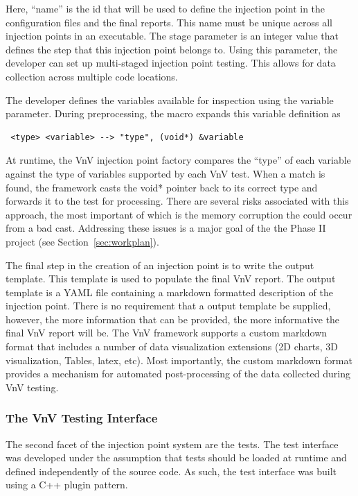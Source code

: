 Here, ``name'' is the id that will be used to define the injection point in the configuration files and the final reports. This name must be unique across all injection points in an executable. The stage parameter is an integer value that defines the step that this injection point belongs to. Using this parameter, the developer can set up multi-staged injection point testing. This allows for data collection across multiple code locations. 

The developer defines the variables available for inspection using the variable parameter. During preprocessing, the macro expands this variable definition as 
\begin{verbatim}
 <type> <variable> --> "type", (void*) &variable 
\end{verbatim}

At runtime, the VnV injection point factory compares the ``type'' of each variable against the type of variables supported by each 
VnV test. When a match is found, the framework casts the void* pointer back to its correct type and forwards it to the test for processing. There are several risks associated with this approach, the most important of which is the memory corruption the could occur from a bad cast. Addressing these issues is a major goal of the the Phase II project (see Section~\ref{sec:workplan}).

The final step in the creation of an injection point is to write the output template. This template is used to populate 
the final VnV report. The output template is a YAML file containing a markdown formatted description of the injection point. There is 
no requirement that a output template be supplied, however, the more information that can be provided, the more informative the final VnV report will be. The VnV framework supports a custom markdown format that includes a number of data visualization extensions (2D charts, 3D visualization, Tables, latex, etc). Most importantly, the custom markdown format provides a mechanism for automated post-processing of the data collected during VnV testing. 

\subsubsection{The VnV Testing Interface}

The second facet of the injection point system are the \VV tests. The test interface was developed under the assumption that tests should be loaded at runtime and defined independently of the source code. As such, the test interface was built using a C++ plugin pattern. 

